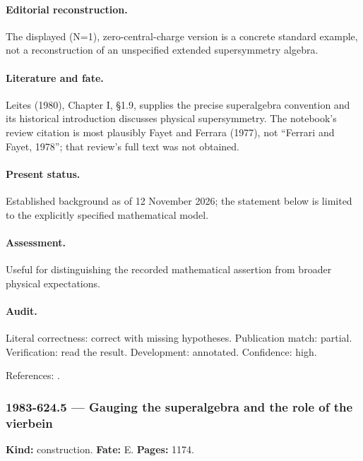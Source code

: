 \paragraph{Editorial reconstruction.} The displayed (N=1), zero-central-charge version is a concrete standard example, not a reconstruction of an unspecified extended supersymmetry algebra.

\paragraph{Literature and fate.} Leites (1980), Chapter I, \S1.9, supplies the precise superalgebra convention and its historical introduction discusses physical supersymmetry. The notebook’s review citation is most plausibly Fayet and Ferrara (1977), not “Ferrari and Fayet, 1978”; that review’s full text was not obtained.

\paragraph{Present status.} Established background as of 12 November 2026; the statement below is limited to the explicitly specified mathematical model.

\paragraph{Assessment.} Useful for distinguishing the recorded mathematical assertion from broader physical expectations.

\paragraph{Audit.} Literal correctness: correct with missing hypotheses. Publication match: partial. Verification: read the result. Development: annotated. Confidence: high.

\noindent References: \citep{leites1980introduction,fayetferrara1977supersymmetry}.\par

\subsubsection{1983-624.5 --- Gauging the superalgebra and the role of the vierbein}

\label{item:1983-624.5}

\noindent\textbf{Kind:} construction. \textbf{Fate:} E. \textbf{Pages:} 1174.\par

